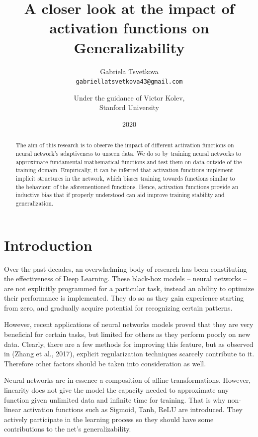 \documentclass{article}
\title{A closer look at the impact of activation functions on Generalizability}
\author{ 
Gabriela Tsvetkova \\ 
\texttt{gabriellatsvetkova43@gmail.com} 
\and  
Under the guidance of Victor Kolev, \\ 
Stanford University
}
\date{2020}
\begin{document}
\maketitle
\begin{abstract}
 The aim of this research is to observe the impact of different activation functions on neural network's adaptiveness to unseen data. We do so by training neural networks to approximate fundamental mathematical functions and test them on data outside of the training domain. Empirically, it can be inferred that activation functions implement implicit structures in the network, which biases training towards functions similar to the behaviour of the aforementioned functions. Hence, activation functions provide an inductive bias that if properly understood can aid improve training stability and generalization.


\end{abstract}


\newpage

\renewcommand{\contentsname}{Content}

\tableofcontents

\newpage
\section{Introduction}
Over the past decades, an overwhelming body of research has been constituting the effectiveness of Deep Learning. These black-box models -- neural networks -- are not explicitly programmed for a particular task, instead an ability to optimize their performance is implemented. They do so as they gain experience starting from zero, and gradually acquire potential for recognizing certain patterns.

However, recent applications of neural networks models proved that they are very beneficial for certain tasks, but limited for others as they perform poorly on new data. Clearly, there are a few methods for improving this feature, but as observed in (Zhang et al., 2017), explicit regularization techniques scarcely contribute to it. Therefore other factors should be taken into consideration as well.

Neural networks are in essence a composition of affine transformations. However, linearity does not give the model the capacity needed to approximate any function given unlimited data and infinite time for training. That is why non-linear activation functions such as Sigmoid, Tanh, ReLU are introduced. They actively participate in the learning process so they should have some contributions to the net’s generalizability. 
\end{document}
